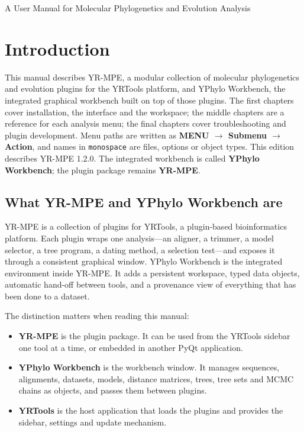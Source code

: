 \documentclass[10pt]{report}
\begin{document}
  {A User Manual for Molecular Phylogenetics and Evolution Analysis}

\setcounter{tocdepth}{0}
{\small
\tableofcontents
}

\chapter{Introduction}

This manual describes YR-MPE, a modular collection of molecular phylogenetics
and evolution plugins for the YRTools platform, and YPhylo Workbench, the
integrated graphical workbench built on top of those plugins. The first
chapters cover installation, the interface and the workspace; the middle
chapters are a reference for each analysis menu; the final chapters cover
troubleshooting and plugin development. Menu paths are written as
\textbf{MENU $\rightarrow$ Submenu $\rightarrow$ Action}, and names in
\texttt{monospace} are files, options or object types. This edition describes
YR-MPE 1.2.0. The integrated workbench is called \textbf{YPhylo Workbench};
the plugin package remains \textbf{YR-MPE}.

\section{What YR-MPE and YPhylo Workbench are}

YR-MPE is a collection of plugins for YRTools, a plugin-based bioinformatics
platform. Each plugin wraps one analysis---an aligner, a trimmer, a model
selector, a tree program, a dating method, a selection test---and exposes it
through a consistent graphical window. YPhylo Workbench is the integrated
environment inside YR-MPE. It adds a persistent workspace, typed data objects,
automatic hand-off between tools, and a provenance view of everything that has
been done to a dataset.

The distinction matters when reading this manual:

\begin{itemize}
  \item \textbf{YR-MPE} is the plugin package. It can be used from the YRTools
        sidebar one tool at a time, or embedded in another PyQt application.
  \item \textbf{YPhylo Workbench} is the workbench window. It manages
        sequences, alignments, datasets, models, distance matrices, trees,
        tree sets and MCMC chains as objects, and passes them between plugins.
  \item \textbf{YRTools} is the host application that loads the plugins and
        provides the sidebar, settings and update mechanism.
\end{itemize}
\end{document}
